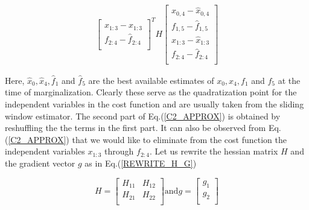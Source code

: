 \begin{equation}
\begin{split}
\begin{bmatrix}
																								x_{1:3} - \hat x_{1:3}\\ 
                                                f_{2:4} - \hat f_{2:4}\\
									              \end{bmatrix}^T H 
												\begin{bmatrix} x_{0,4} - \hat x_{0,4}\\ 
                                        f_{1,5} - \hat f_{1,5}\\
																				x_{1:3} - \hat x_{1:3}\\ 
                                        f_{2:4} - \hat f_{2:4}\\
									      \end{bmatrix} 
\label{C2_APPROX}
\end{split}
\end{equation}

Here, $\hat x_0, \hat x_4, \hat f_1$ and $\hat f_5$ are the best available estimates of $x_0, x_4, f_1$ and $f_5$ at the time of marginalization. Clearly these serve as the quadratization point for the independent variables in the cost function and are usually taken from the sliding window estimator. The second part of Eq.(\ref{C2_APPROX}) is obtained by reshuffling the the terms in the first part. It can also be observed from Eq.(\ref{C2_APPROX}) that we would like to eliminate from the cost function the independent variables $x_{1:3}$ through $f_{2:4}$. Let us rewrite the hessian matrix $H$ and the gradient vector $g$ as in Eq.(\ref{REWRITE_H_G})

\begin{subequations}
\begin{equation}
H = \begin{bmatrix} 
			H_{11} & H_{12} \\
			H_{21} & H_{22} \\
		\end{bmatrix} 
\end{equation}
\text{and}

\begin{equation}
g = \begin{bmatrix} 
			g_{1} \\
			g_{2} \\
		\end{bmatrix}
\end{equation}
\label{REWRITE_H_G}
\end{subequations}

